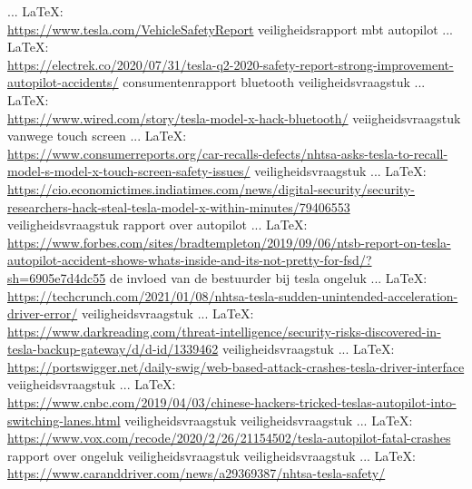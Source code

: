 \begin{thebibliography}{99}
 ... \LaTeX:\\ \url{https://www.tesla.com/VehicleSafetyReport}
veiligheidsrapport mbt autopilot
 ... \LaTeX:\\ \url{https://electrek.co/2020/07/31/tesla-q2-2020-safety-report-strong-improvement-autopilot-accidents/}
consumentenrapport
bluetooth veiligheidsvraagstuk
 ... \LaTeX:\\ \url{https://www.wired.com/story/tesla-model-x-hack-bluetooth/}
veiigheidsvraagstuk vanwege touch screen
 ... \LaTeX:\\ \url{https://www.consumerreports.org/car-recalls-defects/nhtsa-asks-tesla-to-recall-model-s-model-x-touch-screen-safety-issues/}
veiligheidsvraagstuk
 ... \LaTeX:\\ \url{https://cio.economictimes.indiatimes.com/news/digital-security/security-researchers-hack-steal-tesla-model-x-within-minutes/79406553}
veiligheidsvraagstuk
rapport over autopilot
 ... \LaTeX:\\ \url{https://www.forbes.com/sites/bradtempleton/2019/09/06/ntsb-report-on-tesla-autopilot-accident-shows-whats-inside-and-its-not-pretty-for-fsd/?sh=6905e7d4dc55}
de invloed van de bestuurder bij tesla ongeluk
 ... \LaTeX:\\ \url{https://techcrunch.com/2021/01/08/nhtsa-tesla-sudden-unintended-acceleration-driver-error/}
veiligheidsvraagstuk
 ... \LaTeX:\\ \url{https://www.darkreading.com/threat-intelligence/security-risks-discovered-in-tesla-backup-gateway/d/d-id/1339462}
veiligheidsvraagstuk
 ... \LaTeX:\\ \url{https://portswigger.net/daily-swig/web-based-attack-crashes-tesla-driver-interface}
veiigheidsvraagstuk
 ... \LaTeX:\\ \url{https://www.cnbc.com/2019/04/03/chinese-hackers-tricked-teslas-autopilot-into-switching-lanes.html}
veiligheidsvraagstuk
veiligheidsvraagstuk
 ... \LaTeX:\\ \url{https://www.vox.com/recode/2020/2/26/21154502/tesla-autopilot-fatal-crashes}
rapport over ongeluk
veiligheidsvraagstuk
veiligheidsvraagstuk
 ... \LaTeX:\\ \url{https://www.caranddriver.com/news/a29369387/nhtsa-tesla-safety/}

\end{thebibliography}
